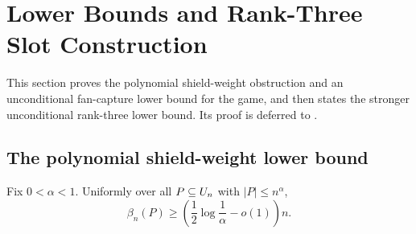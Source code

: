 \section{Lower Bounds and Rank-Three Slot Construction}\label{sec:lower-bounds}

This section proves the polynomial shield-weight obstruction and an
unconditional fan-capture lower bound for the game, and then states the
stronger unconditional rank-three lower bound.  Its proof is deferred to
.

\subsection{The polynomial shield-weight lower bound}

\begin{theorem}\label{thm:theorem-A}
Fix $0<\alpha<1$.  Uniformly over all $P\subseteq U_n$ with $|P|\le n^\alpha$,
\[
  \beta_n(P)\ge
  \left(\frac12\log\frac1\alpha-o(1)\right)n.
\]
\end{theorem}

